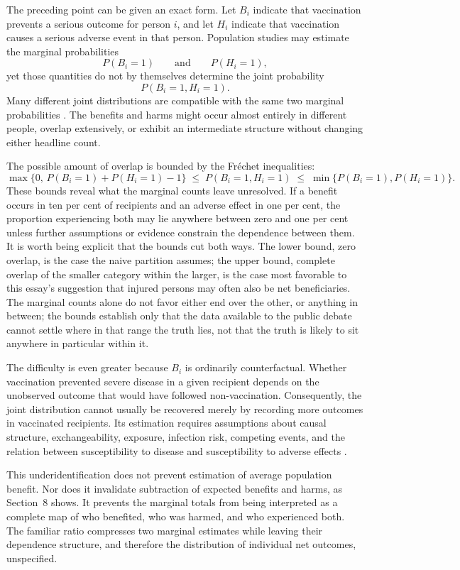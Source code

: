 \documentclass[11pt]{article}
\begin{document}
The preceding point can be given an exact form. Let $B_i$ indicate that vaccination prevents a serious outcome for person $i$, and let $H_i$ indicate that vaccination causes a serious adverse event in that person. Population studies may estimate the marginal probabilities
\[
P(B_i = 1) \qquad \text{and} \qquad P(H_i = 1),
\]
yet those quantities do not by themselves determine the joint probability
\[
P(B_i = 1, H_i = 1).
\]
Many different joint distributions are compatible with the same two marginal probabilities \citep{morganwinship2015}. The benefits and harms might occur almost entirely in different people, overlap extensively, or exhibit an intermediate structure without changing either headline count.

The possible amount of overlap is bounded by the Fr\'echet inequalities:
\[
\max\{0, \, P(B_i=1) + P(H_i=1) - 1\} \; \leq \; P(B_i=1, H_i=1) \; \leq \; \min\{P(B_i=1), P(H_i=1)\}.
\]
These bounds reveal what the marginal counts leave unresolved. If a benefit occurs in ten per cent of recipients and an adverse effect in one per cent, the proportion experiencing both may lie anywhere between zero and one per cent unless further assumptions or evidence constrain the dependence between them. It is worth being explicit that the bounds cut both ways. The lower bound, zero overlap, is the case the naive partition assumes; the upper bound, complete overlap of the smaller category within the larger, is the case most favorable to this essay's suggestion that injured persons may often also be net beneficiaries. The marginal counts alone do not favor either end over the other, or anything in between; the bounds establish only that the data available to the public debate cannot settle where in that range the truth lies, not that the truth is likely to sit anywhere in particular within it.

The difficulty is even greater because $B_i$ is ordinarily counterfactual. Whether vaccination prevented severe disease in a given recipient depends on the unobserved outcome that would have followed non-vaccination. Consequently, the joint distribution cannot usually be recovered merely by recording more outcomes in vaccinated recipients. Its estimation requires assumptions about causal structure, exchangeability, exposure, infection risk, competing events, and the relation between susceptibility to disease and susceptibility to adverse effects \citep{pearl2009}.

This underidentification does not prevent estimation of average population benefit. Nor does it invalidate subtraction of expected benefits and harms, as Section~8 shows. It prevents the marginal totals from being interpreted as a complete map of who benefited, who was harmed, and who experienced both. The familiar ratio compresses two marginal estimates while leaving their dependence structure, and therefore the distribution of individual net outcomes, unspecified.
\end{document}
